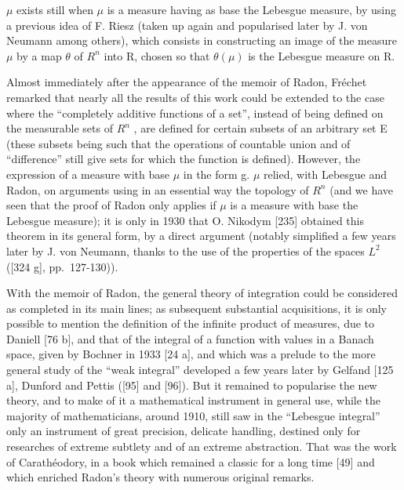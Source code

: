 \(\mu\) exists still when \(\mu\) is a measure having as base the Lebesgue measure, by using a previous idea of F. Riesz (taken up again and popularised later by J. von Neumann among others), which consists in constructing an image of the measure \(\mu\) by a map \(\theta\) of \(R^{n}\) into R, chosen so that \(\theta(\mu)\) is the Lebesgue measure on R.

Almost immediately after the appearance of the memoir of Radon, Fréchet remarked that nearly all the results of this work could be extended to the case where the ``completely additive functions of a set'', instead of being defined on the measurable sets of \(R^{n}\) , are defined for certain subsets of an arbitrary set E (these subsets being such that the operations of countable union and of ``difference'' still give sets for which the function is defined). However, the expression of a measure with base \(\mu\) in the form g. \(\mu\) relied, with Lebesgue and Radon, on arguments using in an essential way the topology of \(R^{n}\) (and we have seen that the proof of Radon only applies if \(\mu\) is a measure with base the Lebesgue measure); it is only in 1930 that O. Nikodym {[}235{]} obtained this theorem in its general form, by a direct argument (notably simplified a few years later by J. von Neumann, thanks to the use of the properties of the spaces \(L^{2}\) ({[}324 g{]}, pp.~127-130)).

With the memoir of Radon, the general theory of integration could be considered as completed in its main lines; as subsequent substantial acquisitions, it is only possible to mention the definition of the infinite product of measures, due to Daniell {[}76 b{]}, and that of the integral of a function with values in a Banach space, given by Bochner in 1933 {[}24 a{]}, and which was a prelude to the more general study of the ``weak integral'' developed a few years later by Gelfand {[}125 a{]}, Dunford and Pettis ({[}95{]} and {[}96{]}). But it remained to popularise the new theory, and to make of it a mathematical instrument in general use, while the majority of mathematicians, around 1910, still saw in the ``Lebesgue integral'' only an instrument of great precision, delicate handling, destined only for researches of extreme subtlety and of an extreme abstraction. That was the work of Carathéodory, in a book which remained a classic for a long time {[}49{]} and which enriched Radon's theory with numerous original remarks.

